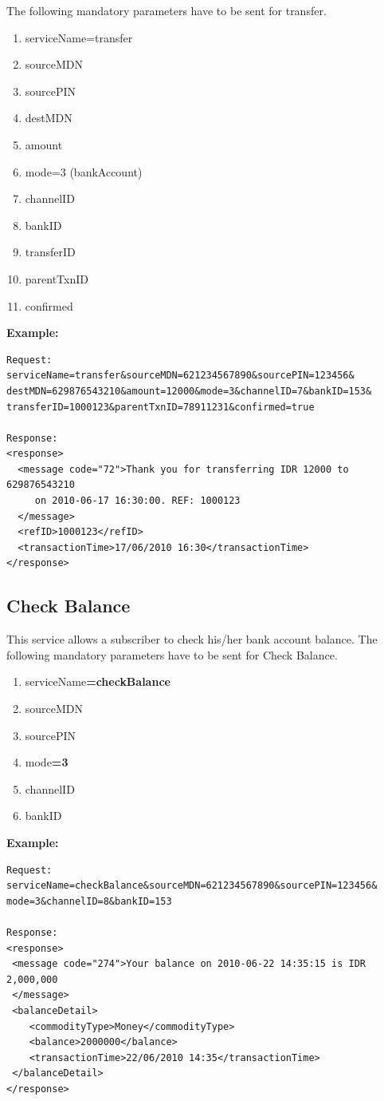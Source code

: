 \documentclass[11pt,titlepage]{article}
\begin{document}
The following mandatory parameters have to be sent for transfer.
\begin{enumerate}
\item serviceName=transfer
\item sourceMDN
\item sourcePIN
\item destMDN
\item amount
\item mode=3 (bankAccount)
\item channelID
\item bankID
\item transferID
\item parentTxnID
\item confirmed
\end{enumerate}
\textbf{Example:}
\begin{verbatim}
Request:
serviceName=transfer&sourceMDN=621234567890&sourcePIN=123456&
destMDN=629876543210&amount=12000&mode=3&channelID=7&bankID=153&
transferID=1000123&parentTxnID=78911231&confirmed=true

Response:
<response>
  <message code="72">Thank you for transferring IDR 12000 to 629876543210
     on 2010-06-17 16:30:00. REF: 1000123
  </message>
  <refID>1000123</refID>
  <transactionTime>17/06/2010 16:30</transactionTime>
</response> 
\end{verbatim}

\subsection{Check Balance}
This service allows a subscriber to check his/her bank account balance. 
The following mandatory parameters have to be sent for Check Balance.
\begin{enumerate}
\item serviceName\textbf{=checkBalance}
\item sourceMDN
\item sourcePIN
\item mode\textbf{=3}
\item channelID
\item bankID
\end{enumerate}
\textbf{Example:}
\begin{verbatim}
Request:
serviceName=checkBalance&sourceMDN=621234567890&sourcePIN=123456&
mode=3&channelID=8&bankID=153

Response:
<response>
 <message code="274">Your balance on 2010-06-22 14:35:15 is IDR 2,000,000
 </message>
 <balanceDetail>
    <commodityType>Money</commodityType>
    <balance>2000000</balance>
    <transactionTime>22/06/2010 14:35</transactionTime>
 </balanceDetail>
</response>
\end{verbatim}
\end{document}
